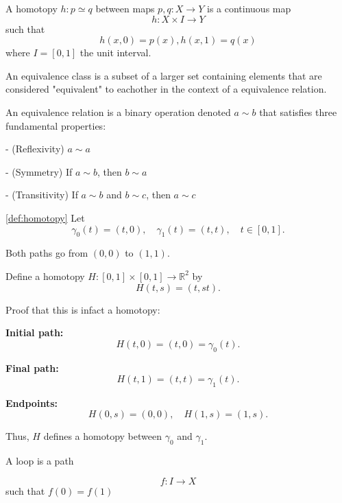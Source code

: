 
\begin{definition}[Homotopy]
  \label{def:homotopy}
  A homotopy $h : p \simeq q$ between maps $p,q : X \to Y$ is a continuous map 
  \[
    h: X \times I \to Y 
  \]
  such that 
  \[
    h(x,0) = p(x),  h(x,1) = q(x)
  \]
  where $I = [0,1]$ the unit interval.
\end{definition}

\begin{definition}
  \label{def:eqclass}
An equivalence class is a subset of a larger set containing elements that are considered 
"equivalent" to eachother in the context of a equivalence relation. 

An equivalence relation is a binary operation denoted $a \sim b$ that satisfies three fundamental properties: 

- (Reflexivity) $a \sim a$ 

- (Symmetry) If $a \sim b$, then $b \sim a$ 

- (Transitivity) If $a \sim b$ and $b \sim c$, then $a \sim c$ 

\end{definition}

\begin{example}
  \label{ex:homotopy}
  \ref{def:homotopy}
Let
$$
\gamma_0(t) = (t,0), \quad \gamma_1(t) = (t,t), \quad t \in [0,1].
$$

Both paths go from $(0,0)$ to $(1,1)$.

Define a homotopy $H : [0,1] \times [0,1] \to \mathbb{R}^2$ by
$$
H(t,s) = (t, s t).
$$


Proof that this is infact a homotopy: 


\textbf{Initial path:}
$$
H(t,0) = (t,0) = \gamma_0(t).
$$

\textbf{Final path:}
$$
H(t,1) = (t,t) = \gamma_1(t).
$$

\textbf{Endpoints:}
$$
H(0,s) = (0,0), \quad H(1,s) = (1,s).
$$

Thus, $H$ defines a homotopy between $\gamma_0$ and $\gamma_1$.
\end{example}

\begin{definition}[Loops]
  \label{def:loops}
  A loop is a path 

  \[
    f : I \to X 
  \]
  such that $f(0)=f(1)$
  
\end{definition}

